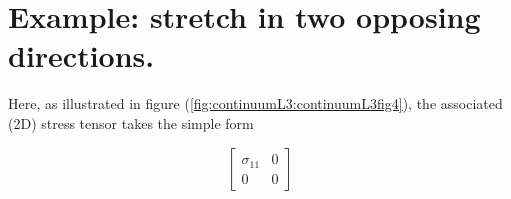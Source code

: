 
\section{Example: stretch in two opposing directions.}


Here, as illustrated in figure (\ref{fig:continuumL3:continuumL3fig4}), the associated (2D) stress tensor takes the simple form

\begin{equation}\label{eqn:continuumL3:370}
\begin{bmatrix}
\sigma_{11} & 0 \\
0 & 0
\end{bmatrix}
\end{equation}

